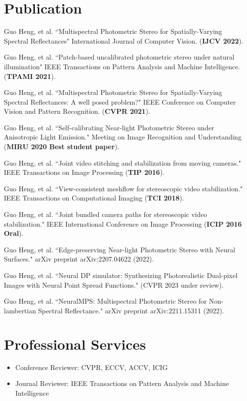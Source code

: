 \documentclass[letterpaper,11pt]{article}
\begin{document}
\section{Publication}
\begin{enumerate}[label={[\arabic*]}]
	\item Guo Heng, et al. ``Multispectral Photometric Stereo for Spatially-Varying Spectral Reflectances" International Journal of Computer Vision. (\textbf{IJCV 2022}). 
	\item Guo Heng, et al. ``Patch-based uncalibrated photometric stereo under natural illumination" 
	IEEE Transactions on Pattern Analysis and Machine Intelligence. (\textbf{TPAMI 2021}). 
	\item Guo Heng, et al. ``Multispectral Photometric Stereo for Spatially-Varying Spectral Reflectances: A well posed problem?" IEEE Conference on Computer Vision and Pattern Recognition. (\textbf{CVPR 2021}). 
	\item Guo Heng, et al. ``Self-calibrating Near-light Photometric Stereo under Anisotropic Light Emission." Meeting on Image Recognition and Understanding (\textbf{MIRU 2020 Best student paper}).  
	\item Guo Heng, et al. ``Joint video stitching and stabilization from moving cameras." IEEE Transactions on Image Processing (\textbf{TIP 2016}).
	\item Guo Heng, et al. ``View-consistent meshflow for stereoscopic video stabilization." IEEE Transactions on Computational Imaging (\textbf{TCI 2018}).
	\item Guo Heng, et al. ``Joint bundled camera paths for stereoscopic video stabilization." IEEE International Conference on Image Processing (\textbf{ICIP 2016 Oral}).
	\item Guo Heng, et al. ``Edge-preserving Near-light Photometric Stereo with Neural Surfaces." arXiv preprint arXiv:2207.04622 (2022). 
	\item Guo Heng, et al. ``Neural DP simulator: Synthesizing Photorealistic Dual-pixel Images with Neural Point Spread Functions." (CVPR 2023 under review). 
	\item Guo Heng, et al. ``NeuralMPS: Multispectral Photometric Stereo for Non-lambertian Spectral Reflectance." arXiv preprint arXiv:2211.15311 (2022).
\end{enumerate}


%
\section{Professional Services}
\begin{itemize}
	\item Conference Reviewer: CVPR, ECCV, ACCV, ICIG
	\item Journal Reviewer: IEEE Transactions on Pattern Analysis and Machine Intelligence
\end{itemize} 


\end{document}
